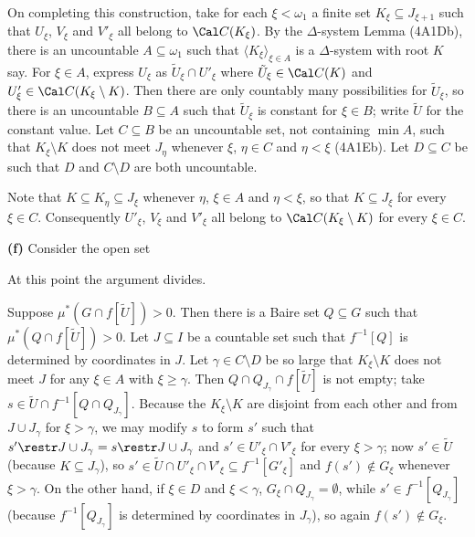 {\noindent On completing this construction, take for each $\xi<\omega_1$
a finite set $K_{\xi}\subseteq J_{\xi+1}$ such that $U_{\xi}$, $V_{\xi}$
and $V'_{\xi}$ all belong to $\Cal C(K_{\xi})$.   By the $\Delta$-system
Lemma (4A1Db), there is an uncountable $A\subseteq\omega_1$ such
that $\langle K_{\xi}\rangle_{\xi\in A}$ is a $\Delta$-system with root
$K$ say.    For $\xi\in A$, express $U_{\xi}$ as 
$\tilde U_{\xi}\cap U'_{\xi}$ where $\tilde U_{\xi}\in\Cal C(K)$ and 
$U'_{\xi}\in\Cal C(K_{\xi}\setminus K)$.   Then there are only countably many
possibilities for $\tilde U_{\xi}$, so there is an uncountable
$B\subseteq A$ such that $\tilde U_{\xi}$ is constant for $\xi\in B$;
write $\tilde U$ for the constant value.   Let $C\subseteq B$ be an
uncountable set, not containing $\min A$, such that $K_{\xi}\setminus K$
does not meet $J_{\eta}$ whenever $\xi$, $\eta\in C$ and $\eta<\xi$
(4A1Eb).   Let $D\subseteq C$ be such that $D$ and $C\setminus D$
are both uncountable.

Note that $K\subseteq K_{\eta}\subseteq J_{\xi}$ whenever $\eta$,
$\xi\in A$ and $\eta<\xi$, so that $K\subseteq J_{\xi}$ for every
$\xi\in C$.   Consequently $U'_{\xi}$, $V_{\xi}$ and $V'_{\xi}$ all
belong to $\Cal C(K_{\xi}\setminus K)$ for every $\xi\in C$.

\medskip

{\bf (f)} Consider the open set


\noindent At this point the argument divides.

\medskip

 Suppose $\mu^*(G\cap f[\tilde U])>0$.   Then there is
a Baire set $Q\subseteq G$ such that $\mu^*(Q\cap f[\tilde U])>0$.   Let
$J\subseteq I$ be a countable set such that $f^{-1}[Q]$ is determined by
coordinates in $J$.
Let $\gamma\in C\setminus D$ be so large that $K_{\xi}\setminus K$ does
not meet $J$ for any $\xi\in A$ with $\xi\ge\gamma$.   Then 
$Q\cap Q_{J_{\gamma}}\cap f[\tilde U]$ is not empty;  take
$s\in \tilde U\cap f^{-1}[Q\cap Q_{J_{\gamma}}]$.   Because the
$K_{\xi}\setminus K$ are disjoint from each other and from 
$J\cup J_{\gamma}$ for $\xi>\gamma$, we may modify $s$ to form $s'$
such that
$s'\restr J\cup J_{\gamma}=s\restr J\cup J_{\gamma}$ and 
$s'\in U'_{\xi}\cap V'_{\xi}$ for every $\xi>\gamma$;  now
$s'\in\tilde U$ (because $K\subseteq J_{\gamma}$), so 
$s'\in\tilde U\cap U'_{\xi}\cap V'_{\xi}\subseteq f^{-1}[G'_{\xi}]$ and 
$f(s')\notin G_{\xi}$ whenever $\xi>\gamma$.   On the other hand, if $\xi\in D$ and 
$\xi<\gamma$,
$G_{\xi}\cap Q_{J_{\gamma}}=\emptyset$, while $s'\in f^{-1}[Q_{J_{\gamma}}]$ (because
$f^{-1}[Q_{J_{\gamma}}]$  is determined by coordinates in $J_{\gamma}$),
so again $f(s')\notin G_{\xi}$.

}
